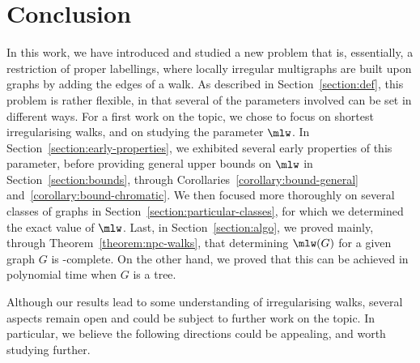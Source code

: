 \documentclass[a4paper,11pt,dvipsnames]{elsarticle}
\newcommand{\sam}[1]{\todo[size=\tiny,color=red!20!white]{\textbf{Sam:} #1}}
\newcommand{\sam}[1]{}
\begin{document}






\section{Conclusion}\label{section:ccl}

In this work, we have introduced and studied a new problem that is, essentially, a restriction of proper labellings, where locally irregular multigraphs are built upon graphs by adding the edges of a walk. As described in Section~\ref{section:def}, this problem is rather flexible, in that several of the parameters involved can be set in different ways. For a first work on the topic, we chose to focus on shortest irregularising walks, and on studying the parameter $\mlw$. In Section~\ref{section:early-properties}, we exhibited several early properties of this parameter, before providing general upper bounds on $\mlw$ in Section~\ref{section:bounds}, through Corollaries~\ref{corollary:bound-general} and~\ref{corollary:bound-chromatic}. We then focused more thoroughly on several classes of graphs in Section~\ref{section:particular-classes}, for which we determined the exact value of $\mlw$. Last, in Section~\ref{section:algo}, we proved mainly, through Theorem~\ref{theorem:npc-walks}, that determining $\mlw(G)$ for a given graph $G$ is \np-complete. On the other hand, we proved that this can be achieved in polynomial time when $G$ is a tree.

Although our results lead to some understanding of irregularising walks, several aspects remain open and could be subject to further work on the topic. In particular, we believe the following directions could be appealing, and worth studying further.
\end{document}
